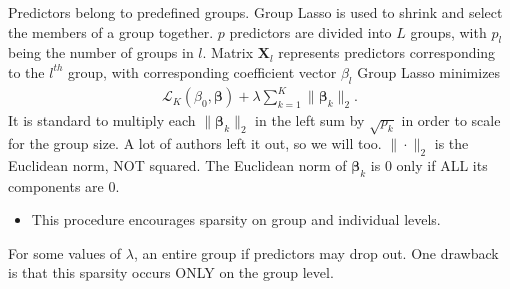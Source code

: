 \documentclass[10pt]{article}
\begin{document}
Predictors belong to predefined groups. Group Lasso is used to shrink and select the members of a group together. $p$ predictors are divided into $L$ groups, with $p_{l}$ being the number of groups in $l$. Matrix $\mathbf{X}_{l}$ represents predictors corresponding to the $l^{th}$ group, with corresponding coefficient vector $\beta_{l}$ Group Lasso minimizes
    \begin{align}
    \label{glasso}
         \mathcal{L}_K(\beta_0, \bm{\beta}) + \lambda \sum_{k=1}^K \| \bm{\beta}_k \|_2.
    \end{align}
It is standard to multiply each $\| \bm{\beta}_k \|_2$ in the left sum by $\sqrt{p_k}$ in order to scale for the group size. A lot of authors left it out, so we will too. $\| \cdot \|_2$ is the Euclidean norm, NOT squared. The Euclidean norm of $\bm{\beta}_k$ is $0$ only if ALL its components are $0$.
\begin{itemize}
    \item This procedure encourages sparsity on group and individual levels.
\end{itemize}
For some values of $\lambda$, an entire group if predictors may drop out.
One drawback is that this sparsity occurs ONLY on the group level.
\end{document}
